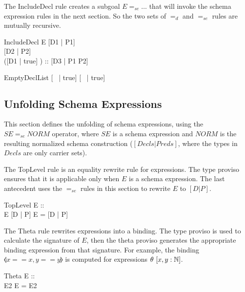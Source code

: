 \documentclass{entcs}
\newcommand{\sexprUnfoldsTo}{\mathrel{=_{se}}}
\newcommand{\declListUnfoldsTo}{\mathrel{=_d}}
\newcommand{\is}{\mathrel{is}}
\begin{document}
The IncludeDecl rule creates a subgoal $E \sexprUnfoldsTo \ldots$ that
will invoke the schema expression rules in the next section.  So the
two sets of $\declListUnfoldsTo$ and $\sexprUnfoldsTo$ rules are
mutually recursive.

\begin{zedrule}{IncludeDecl}
   E \sexprUnfoldsTo [D1 | P1] \\
   [D | true] \declListUnfoldsTo [D2 | P2] \\
   \proviso ([D1 | true] \land [D2 | true]) :: \power [D3 | true] 
\derives
   [E; D | true] \declListUnfoldsTo [D3 |  P1 \land P2]
\end{zedrule}

\begin{zedrule}{EmptyDeclList}
   [~ | true] \declListUnfoldsTo [~ | true]
\end{zedrule}


\subsection{Unfolding Schema Expressions}

This section defines the unfolding of schema expressions,
using the $SE \sexprUnfoldsTo NORM$ operator, where $SE$
is a schema expression and $NORM$ is the resulting normalized
schema construction ($[Decls|Preds]$, where the types in $Decls$
are only carrier sets).

The TopLevel rule is an equality rewrite rule for expressions.  The
type proviso ensures that it is applicable only when $E$ is a schema
expression.  The last antecedent uses the $\sexprUnfoldsTo$ rules in
this section to rewrite $E$ to $[D | P]$.

\begin{zedrule}{TopLevel}
  \proviso E :: \power [D2 | true] \\
  E  \sexprUnfoldsTo [D | P]
\derives
  E = [D | P]
\end{zedrule}

The Theta rule rewrites expressions into a binding.  The type proviso
is used to calculate the signature of $E$, then the theta proviso
generates the appropriate binding expression from that signature.  For
example, the binding $\lblot x==x,y==y \rblot$ is computed for
expressions $\theta~[x,y:{\mathbb N}]$.
\begin{zedrule}{Theta}
  \proviso E :: \power [D | true] \\
  \proviso \theta [D | true] \is E2
\derives
  \theta E = E2
\end{zedrule}
\end{document}
